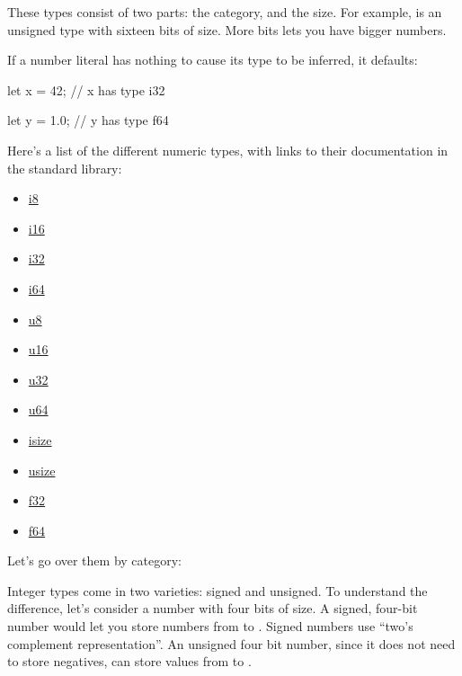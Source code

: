 \blank

These types consist of two parts: the category, and the size. For example,  is an unsigned type with sixteen bits of size. 
More bits lets you have bigger numbers.

\blank

If a number literal has nothing to cause its type to be inferred, it defaults:

\begin{rustc}
let x = 42; // x has type i32

let y = 1.0; // y has type f64
\end{rustc}

Here's a list of the different numeric types, with links to their documentation in the standard library:

\begin{itemize}
  \item{\href{https://doc.rust-lang.org/std/primitive.i8.html}{i8}}
  \item{\href{https://doc.rust-lang.org/std/primitive.i16.html}{i16}}
  \item{\href{https://doc.rust-lang.org/std/primitive.i32.html}{i32}}
  \item{\href{https://doc.rust-lang.org/std/primitive.i64.html}{i64}}
  \item{\href{https://doc.rust-lang.org/std/primitive.u8.html}{u8}}
  \item{\href{https://doc.rust-lang.org/std/primitive.u16.html}{u16}}
  \item{\href{https://doc.rust-lang.org/std/primitive.u32.html}{u32}}
  \item{\href{https://doc.rust-lang.org/std/primitive.u64.html}{u64}}
  \item{\href{https://doc.rust-lang.org/std/primitive.isize.html}{isize}}
  \item{\href{https://doc.rust-lang.org/std/primitive.usize.html}{usize}}
  \item{\href{https://doc.rust-lang.org/std/primitive.f32.html}{f32}}
  \item{\href{https://doc.rust-lang.org/std/primitive.f64.html}{f64}}
\end{itemize}

Let's go over them by category:


Integer types come in two varieties: signed and unsigned. To understand the difference, let's consider a number with four bits of size. 
A signed, four-bit number would let you store numbers from  to . Signed numbers use “two's complement representation”. 
An unsigned four bit number, since it does not need to store negatives, can store values from  to .

